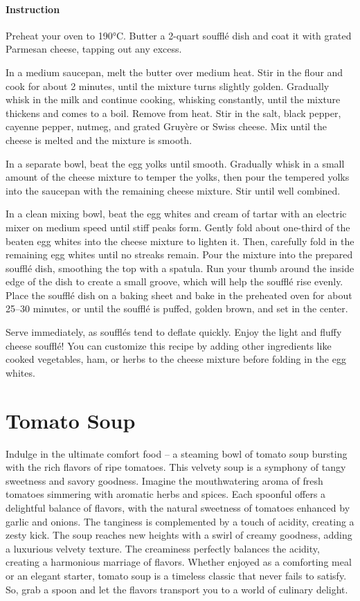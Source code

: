\paragraph{Instruction} Preheat your oven to 190°C. Butter a 2-quart soufflé dish and coat it with grated Parmesan cheese, tapping out any excess.

In a medium saucepan, melt the butter over medium heat. Stir in the flour and cook for about 2 minutes, until the mixture turns slightly golden. Gradually whisk in the milk and continue cooking, whisking constantly, until the mixture thickens and comes to a boil. Remove from heat. Stir in the salt, black pepper, cayenne pepper, nutmeg, and grated Gruyère or Swiss cheese. Mix until the cheese is melted and the mixture is smooth.

In a separate bowl, beat the egg yolks until smooth. Gradually whisk in a small amount of the cheese mixture to temper the yolks, then pour the tempered yolks into the saucepan with the remaining cheese mixture. Stir until well combined.

In a clean mixing bowl, beat the egg whites and cream of tartar with an electric mixer on medium speed until stiff peaks form. Gently fold about one-third of the beaten egg whites into the cheese mixture to lighten it. Then, carefully fold in the remaining egg whites until no streaks remain. Pour the mixture into the prepared soufflé dish, smoothing the top with a spatula. Run your thumb around the inside edge of the dish to create a small groove, which will help the soufflé rise evenly. Place the soufflé dish on a baking sheet and bake in the preheated oven for about 25--30 minutes, or until the soufflé is puffed, golden brown, and set in the center.

Serve immediately, as soufflés tend to deflate quickly. Enjoy the light and fluffy cheese soufflé! You can customize this recipe by adding other ingredients like cooked vegetables, ham, or herbs to the cheese mixture before folding in the egg whites.

\section{Tomato Soup}
\label{tomatosoup}
Indulge in the ultimate comfort food -- a steaming bowl of tomato soup bursting with the rich flavors of ripe tomatoes. This velvety soup is a symphony of tangy sweetness and savory goodness. Imagine the mouthwatering aroma of fresh tomatoes simmering with aromatic herbs and spices. Each spoonful offers a delightful balance of flavors, with the natural sweetness of tomatoes enhanced by garlic and onions. The tanginess is complemented by a touch of acidity, creating a zesty kick. The soup reaches new heights with a swirl of creamy goodness, adding a luxurious velvety texture. The creaminess perfectly balances the acidity, creating a harmonious marriage of flavors. Whether enjoyed as a comforting meal or an elegant starter, tomato soup is a timeless classic that never fails to satisfy. So, grab a spoon and let the flavors transport you to a world of culinary delight.


